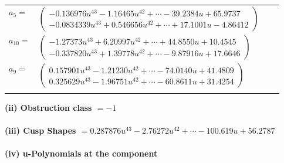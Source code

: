 \documentclass[1p]{elsarticle_modified}
\theoremstyle{definition}
\begin{document}
\begin{tabular}{m{7pt} m{180pt} m{7pt} m{180pt} }
\flushright $a_{5}=$&$\begin{pmatrix}-0.136976 u^{43}-1.16465 u^{42}+\cdots-39.2384 u+65.9737\\-0.0834339 u^{43}+0.546656 u^{42}+\cdots+17.1001 u-4.86412\end{pmatrix}$ \\
\flushright $a_{10}=$&$\begin{pmatrix}-1.27373 u^{43}+6.20997 u^{42}+\cdots+44.8550 u+10.4545\\-0.337820 u^{43}+1.39778 u^{42}+\cdots-9.87916 u+17.6646\end{pmatrix}$ \\
\flushright $a_{9}=$&$\begin{pmatrix}0.157901 u^{43}-1.21230 u^{42}+\cdots-74.0140 u+41.4809\\0.325629 u^{43}-1.96751 u^{42}+\cdots-60.8611 u+31.4254\end{pmatrix}$\\&\end{tabular}
\flushleft \textbf{(ii) Obstruction class $= -1$}\\~\\
\flushleft \textbf{(iii) Cusp Shapes $= 0.287876 u^{43}-2.76272 u^{42}+\cdots-100.619 u+56.2787$}\\~\\
\newpage\renewcommand{\arraystretch}{1}
\flushleft \textbf{(iv) u-Polynomials at the component}\newline \\
\end{document}
